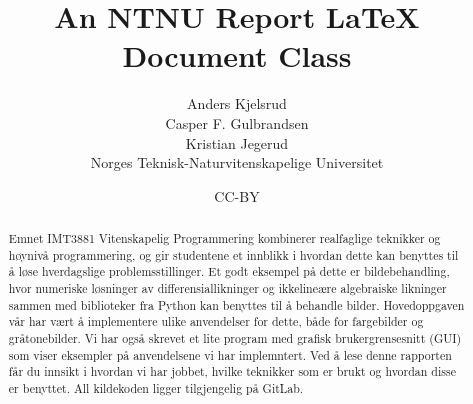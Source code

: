 \documentclass[british]{ntnureport}
\title{An NTNU Report \LaTeX{} Document Class}
\author{Anders Kjelsrud \\
        Casper F. Gulbrandsen \\
		Kristian Jegerud \\ 
		Norges Teknisk-Naturvitenskapelige Universitet }
\date{CC-BY \ntnureportdate}
\begin{document}
\begin{abstract}
    Emnet IMT3881 Vitenskapelig Programmering kombinerer realfaglige teknikker og høynivå programmering, og 
    gir studentene et innblikk i hvordan dette kan benyttes til å løse hverdagslige problemsstillinger. Et godt 
    eksempel på dette er bildebehandling, hvor numeriske løsninger av differensiallikninger og ikkelineære algebraiske
    likninger sammen med biblioteker fra Python kan benyttes til å behandle bilder. Hovedoppgaven vår har vært å
    implementere ulike anvendelser for dette, både for fargebilder og gråtonebilder. Vi har også skrevet et lite
    program med grafisk brukergrensesnitt (GUI) som viser eksempler på anvendelsene vi har implemntert. Ved å lese
    denne rapporten får du innsikt i hvordan vi har jobbet, hvilke teknikker som er brukt og hvordan disse er
    benyttet. All kildekoden ligger tilgjengelig på GitLab\cite{gitsource}. 
\end{abstract}






\printbibliography{}

\appendix


\end{document}
